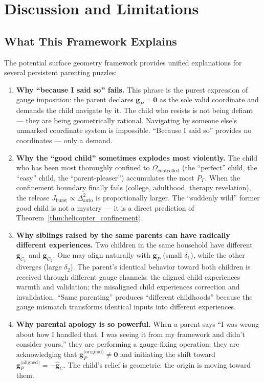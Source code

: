 \documentclass[11pt,a4paper]{article}
\begin{document}
\section{Discussion and Limitations}
\label{sec:discussion}

\subsection{What This Framework Explains}

The potential surface geometry framework provides unified explanations for several persistent parenting puzzles:

\begin{enumerate}[label=(\arabic*)]
    \item \textbf{Why ``because I said so'' fails.} This phrase is the purest expression of gauge imposition: the parent declares $\mathbf{g}_P = \mathbf{0}$ as the sole valid coordinate and demands the child navigate by it. The child who resists is not being defiant — they are being geometrically rational. Navigating by someone else's unmarked coordinate system is impossible. ``Because I said so'' provides no coordinates — only a demand.

    \item \textbf{Why the ``good child'' sometimes explodes most violently.} The child who has been most thoroughly confined to $\Omega_{\text{controlled}}$ (the ``perfect'' child, the ``easy'' child, the ``parent-pleaser'') accumulates the most $P_{\Gamma}$. When the confinement boundary finally fails (college, adulthood, therapy revelation), the release $J_{\text{burst}} \propto \Delta_{\text{auto}}^2$ is proportionally larger. The ``suddenly wild'' former good child is not a mystery — it is a direct prediction of Theorem~\ref{thm:helicopter_confinement}.

    \item \textbf{Why siblings raised by the same parents can have radically different experiences.} Two children in the same household have different $\mathbf{g}_{C_1}$ and $\mathbf{g}_{C_2}$. One may align naturally with $\mathbf{g}_P$ (small $\delta_1$), while the other diverges (large $\delta_2$). The parent's identical behavior toward both children is received through different gauge channels: the aligned child experiences warmth and validation; the misaligned child experiences correction and invalidation. ``Same parenting'' produces ``different childhoods'' because the gauge mismatch transforms identical inputs into different experiences.

    \item \textbf{Why parental apology is so powerful.} When a parent says ``I was wrong about how I handled that. I was seeing it from my framework and didn't consider yours,'' they are performing a gauge-fixing operation: they are acknowledging that $\mathbf{g}_P^{\text{(original)}} \neq \mathbf{0}$ and initiating the shift toward $\mathbf{g}_P^{\text{(aligned)}} = -\hat{\mathbf{g}}_C$. The child's relief is geometric: the origin is moving toward them.
\end{enumerate}
\end{document}
